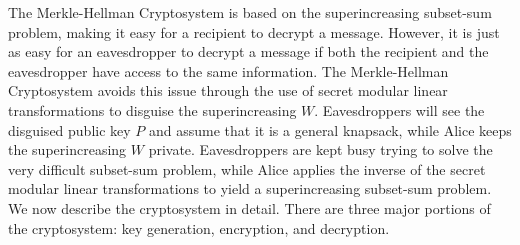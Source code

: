\documentclass[a4paper,12pt]{article}
\begin{document}
The Merkle-Hellman Cryptosystem is based on the superincreasing subset-sum problem, making it easy for a recipient to decrypt a message. However, it is just as easy for an eavesdropper to decrypt a message if both the recipient and the eavesdropper have access to the same information. The Merkle-Hellman Cryptosystem avoids this issue through the use of secret modular linear transformations to disguise the superincreasing $W$. Eavesdroppers will see the disguised public key $P$ and assume that it is a general knapsack, while Alice keeps the superincreasing $W$ private. Eavesdroppers are kept busy trying to solve the very difficult subset-sum problem, while Alice applies the inverse of the secret modular linear transformations to yield a superincreasing subset-sum problem. We now describe the cryptosystem in detail. There are three major portions of the cryptosystem: key generation, encryption, and decryption.
\end{document}
